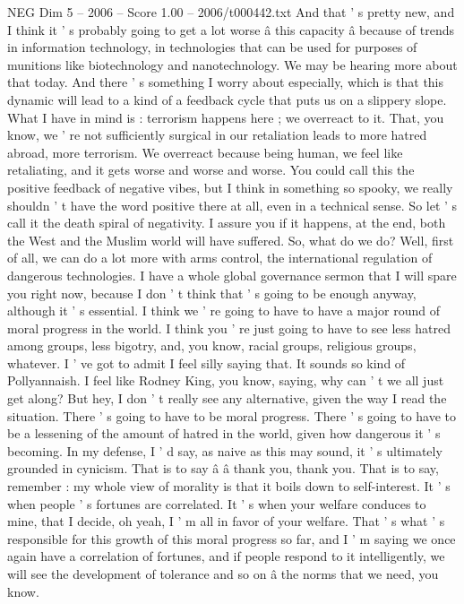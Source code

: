 \begin{textsample}{NEG Dim 5 – 2006 – Score 1.00 – 2006/t000442.txt}
And that ' s pretty new, and I think it ' s probably going to get a lot worse â this capacity â because of trends in information technology, in technologies that can be used for purposes of munitions like biotechnology and nanotechnology.
We may be hearing more about that today.
And there ' s something I worry about especially, which is that this dynamic will lead to a kind of a feedback cycle that puts us on a slippery slope.
What I have in mind is : terrorism happens here ; we overreact to it.
That, you know, we ' re not sufficiently surgical in our retaliation leads to more hatred abroad, more terrorism.
We overreact because being human, we feel like retaliating, and it gets worse and worse and worse.
You could call this the positive feedback of negative vibes, but I think in something so spooky, we really shouldn ' t have the word positive there at all, even in a technical sense.
So let ' s call it the death spiral of negativity.
I assure you if it happens, at the end, both the West and the Muslim world will have suffered.
So, what do we do?
Well, first of all, we can do a lot more with arms control, the international regulation of dangerous technologies.
I have a whole global governance sermon that I will spare you right now, because I don ' t think that ' s going to be enough anyway, although it ' s essential.
I think we ' re going to have to have a major round of moral progress in the world.
I think you ' re just going to have to see less hatred among groups, less bigotry, and, you know, racial groups, religious groups, whatever.
I ' ve got to admit I feel silly saying that.
It sounds so kind of Pollyannaish.
I feel like Rodney King, you know, saying, why can ' t we all just get along?
But hey, I don ' t really see any alternative, given the way I read the situation.
There ' s going to have to be moral progress.
There ' s going to have to be a lessening of the amount of hatred in the world, given how dangerous it ' s becoming.
In my defense, I ' d say, as naive as this may sound, it ' s ultimately grounded in cynicism.
That is to say â â thank you, thank you.
That is to say, remember : my whole view of morality is that it boils down to self-interest.
It ' s when people ' s fortunes are correlated.
It ' s when your welfare conduces to mine, that I decide, oh yeah, I ' m all in favor of your welfare.
That ' s what ' s responsible for this growth of this moral progress so far, and I ' m saying we once again have a correlation of fortunes, and if people respond to it intelligently, we will see the development of tolerance and so on â the norms that we need, you know.

\end{textsample}

